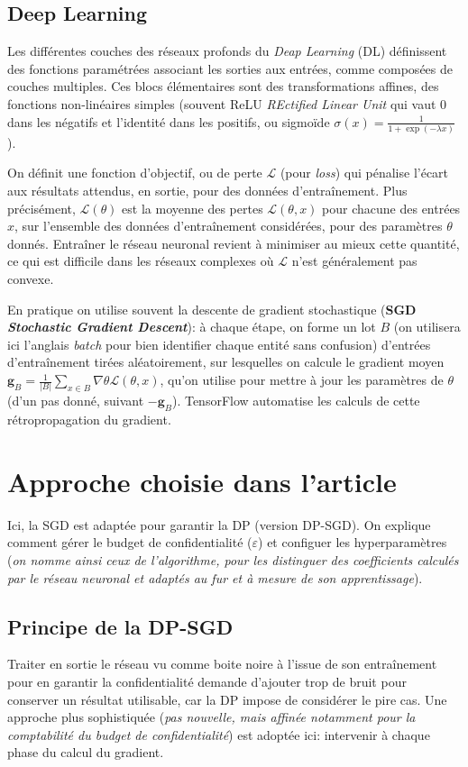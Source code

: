 \documentclass[a4paper,11pt]{article} %
\newcommand{\evid}[1]{\colorbox{blue!10}{\textbf{#1}}}
\begin{document}
\subsection{Deep Learning}
%
Les différentes couches des réseaux \og profonds\fg{} du \emph{Deap Learning} (DL) définissent des fonctions paramétrées associant les sorties aux entrées, comme composées de couches multiples. Ces blocs élémentaires sont des transformations affines, des fonctions non-linéaires simples (souvent ReLU \emph{REctified Linear Unit} qui vaut 0 dans les négatifs et l'identité dans les positifs, ou sigmoïde $\sigma(x) = \frac{1}{1+\exp(-\lambda x)}$).

On définit une fonction d'objectif, ou de perte $\mathcal{L}$ (pour \emph{loss}) qui pénalise l'écart aux résultats attendus, en sortie, pour des données d'entraînement. Plus précisément, $\mathcal{L}(\theta)$ est la moyenne des pertes $\mathcal{L}(\theta, x)$ pour chacune des entrées $x$, sur l'ensemble des données d'entraînement considérées, pour des paramètres $\theta$ donnés. Entraîner le réseau neuronal revient à minimiser au mieux cette quantité, ce qui est difficile dans les réseaux complexes où $\mathcal{L}$ n'est généralement pas convexe.

En pratique on utilise souvent la descente de gradient stochastique (\evid{SGD} \evid{\emph{Stochastic Gradient Descent}}): à chaque étape, on forme un lot $B$ (on utilisera ici l'anglais \emph{batch} pour bien identifier chaque entité sans confusion) d'entrées d'entraînement tirées aléatoirement, sur lesquelles on calcule le gradient moyen $\mathbf{g}_B = \frac{1}{|B|}\sum_{x\in B}\nabla\theta \mathcal{L}(\theta, x)$, qu'on utilise pour mettre à jour les paramètres de $\theta$ (d'un \og pas\fg{} donné, suivant $-\mathbf{g}_B$). TensorFlow automatise les calculs de cette rétropropagation du gradient.

\section{Approche choisie dans l'article}
Ici, la SGD est adaptée pour garantir la DP (version DP-SGD). On explique comment gérer le budget de confidentialité ($\varepsilon$) et configuer les hyperparamètres (\emph{on nomme ainsi ceux de l'algorithme, pour les distinguer des coefficients calculés par le réseau neuronal et adaptés au fur et à mesure de son apprentissage}).
%
\subsection{Principe de la DP-SGD}
%
Traiter en sortie le réseau vu comme \og boite noire\fg{} à l'issue de son entraînement pour en garantir la confidentialité demande d'ajouter trop de bruit pour conserver un résultat utilisable, car la DP impose de considérer le pire cas. Une approche plus sophistiquée (\emph{pas nouvelle, mais affinée notamment pour la comptabilité du budget de confidentialité}) est adoptée ici:  intervenir à chaque phase du calcul du gradient.
\end{document}
